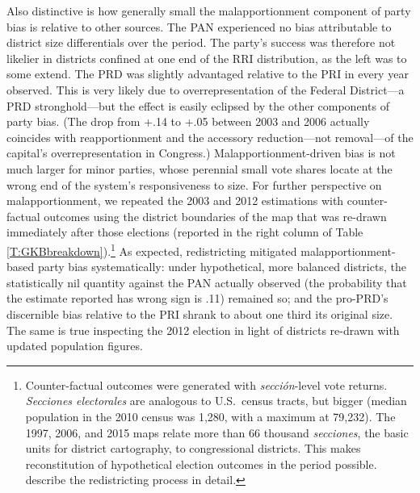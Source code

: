\documentclass[letter,12pt]{article}
\begin{document}
Also distinctive is how generally small the malapportionment component of party bias is relative to other sources. The PAN experienced no bias attributable to district size differentials over the period. The party's success was therefore not likelier in districts confined at one end of the RRI distribution, as the left was to some extend. The PRD was slightly advantaged relative to the PRI in every year observed. This is very likely due to overrepresentation of the Federal District---a PRD stronghold---but the effect is easily eclipsed by the other components of party bias. (The drop from +.14 to +.05 between 2003 and 2006 actually coincides with reapportionment and the accessory reduction---not removal---of the capital's overrepresentation in Congress.) Malapportionment-driven bias is not much larger for minor parties, whose perennial small vote shares locate at the wrong end of the system's responsiveness to size. For further perspective on malapportionment, we repeated the 2003 and 2012 estimations with counter-factual outcomes using the district boundaries of the map that was re-drawn immediately after those elections (reported in the right column of Table \ref{T:GKBbreakdown}).\footnote{Counter-factual outcomes were generated with \emph{secci\'on}-level vote returns. \emph{Secciones electorales} are analogous to U.S.\ census tracts, but bigger (median population in the 2010 census was 1,280, with a maximum at 79,232). The 1997, 2006, and 2015 maps relate more than 66 thousand \emph{secciones}, the basic units for district cartography, to congressional districts. This makes reconstitution of hypothetical election outcomes in the period possible. \citet{altman.magar.mcd.trelles2014apsa} describe the redistricting process in detail.} As expected, redistricting mitigated malapportionment-based party bias systematically: under hypothetical, more balanced districts, the statistically nil quantity against the PAN actually observed (the probability that the estimate reported has wrong sign is .11) remained so; and the pro-PRD's discernible bias relative to the PRI shrank to about one third its original size. The same is true inspecting the 2012 election in light of districts re-drawn with updated population figures. 
\end{document}
